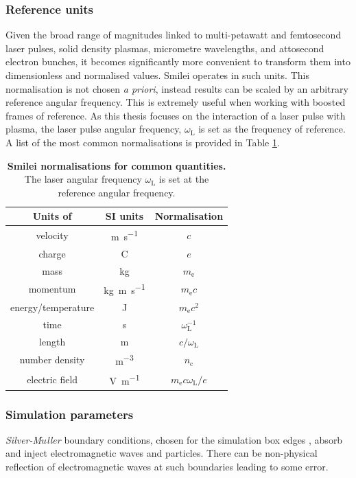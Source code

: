 \subsubsection{Reference units}
Given the broad range of magnitudes linked to multi-petawatt and femtosecond laser pulses, solid density plasmas, micrometre wavelengths, and attosecond electron bunches, it becomes significantly more convenient to transform them into dimensionless and normalised values. Smilei operates in such units. This normalisation is not chosen \textit{a priori}, instead results can be scaled by an arbitrary reference angular frequency. This is extremely useful when working with boosted frames of reference. As this thesis focuses on the interaction of a laser pulse with plasma, the laser pulse angular frequency, $\omega_\mathrm{L}$ is set as the frequency of reference. A list of the most common normalisations is provided in Table \ref{tab:intro-normalisations}.

\begin{table}
	\begin{center}
		\begin{tabular}{ccc}
			\hline \hline
			Units of & SI units & Normalisation \\
			\hline
			velocity & \unit{m.s^{-1}} & $c$ \\
			charge & C & $e$ \\
			mass & kg & $m_\mathrm{e}$ \\
			momentum & \unit{kg.m.s^{-1}} & $m_\mathrm{e}c$ \\
			energy/temperature & J & $m_\mathrm{e}c^2$ \\
			time & s & $\omega^{-1}_\mathrm{L}$ \\
			length & m & $c/\omega_\mathrm{L}$ \\
			number density & \unit{m^{-3}} & $n_\mathrm{c}$ \\
			electric field & \unit{V.m^{-1}} & $m_\mathrm{e}c\omega_\mathrm{L}/e$ \\
			\hline \hline
		\end{tabular}
		\caption{\label{tab:intro-normalisations} \textbf{Smilei normalisations for common quantities.} The laser angular frequency $\omega_\mathrm{L}$ is set at the reference angular frequency.}
	\end{center}
\end{table}

\subsubsection{Simulation parameters}\label{sec:intro-general_simulation_paramers}
\textit{Silver-M$\ddot{u}$ller} boundary conditions, chosen for the simulation box edges \cite{barucqAsymptoticBehaviorSolutions1997}, absorb and inject electromagnetic waves and particles. There can be non-physical reflection of electromagnetic waves at such boundaries leading to some error.

